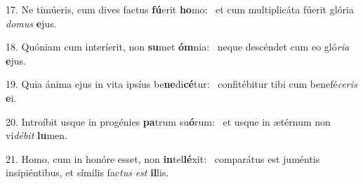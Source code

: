 17. Ne timúeris, cum dives factus \textbf{fú}erit \textbf{ho}mo: \ast\  et cum multiplicáta fúerit glória \textit{do}\textit{mus} \textbf{e}jus.\

18. Quóniam cum interíerit, non \textbf{su}met \textbf{óm}nia: \ast\  neque descéndet cum eo gló\textit{ri}\textit{a} \textbf{e}jus.\

19. Quia ánima ejus in vita ipsíus be\textbf{ne}di\textbf{cé}tur: \ast\  confitébitur tibi cum benefé\textit{ce}\textit{ris} \textbf{e}i.\

20. Introíbit usque in progénies \textbf{pa}trum su\textbf{ó}rum: \ast\  et usque in ætérnum non vi\textit{dé}\textit{bit} \textbf{lu}men.\

21. Homo, cum in honóre esset, non \textbf{in}tel\textbf{lé}xit: \ast\  comparátus est juméntis insipiéntibus, et símilis fac\textit{tus} \textit{est} \textbf{il}lis.\

